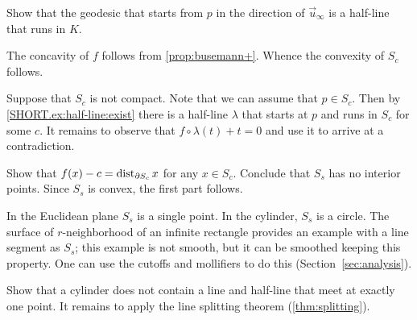 Show that the geodesic that starts from $p$ in the direction of $\vec u_\infty$ is a half-line that runs in $K$.

 The concavity of $f$ follows from \ref{prop:busemann+}.
Whence the convexity of $S_c$ follows.

Suppose that $S_c$ is not compact.
Note that we can assume that $p\in S_c$.
Then by \ref{SHORT.ex:half-line:exist} there is a half-line $\lambda$ that starts at $p$ and runs in $S_c$ for some $c$.
It remains to observe that $f\circ\lambda(t)+t=0$ and use it to arrive at a contradiction.

Show that 
$f(x)-c=\mathop{\rm dist}\nolimits_{\partial S_c}x$
for any $x\in S_c$.
Conclude that $S_s$ has no interior points.
Since $S_s$ is convex, the first part follows.

In the Euclidean plane $S_s$ is a single point.
In the cylinder, $S_s$ is a circle.
The surface of $r$-neighborhood of an infinite rectangle provides an example with a line segment as $S_s$; this example is not smooth, but it can be smoothed keeping this property.
One can use the cutoffs and mollifiers to do this (Section~\ref{sec:analysis}).


Show that a cylinder does not contain a line and half-line that meet at exactly one point.
It remains to apply the line splitting theorem (\ref{thm:splitting}).



